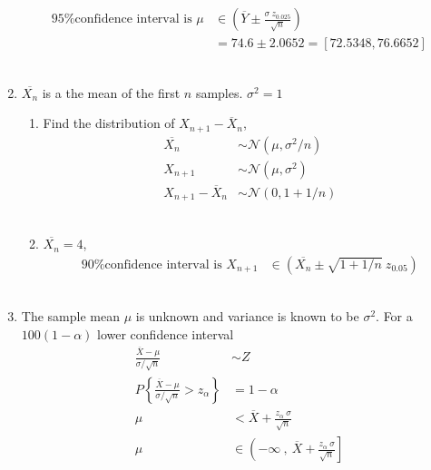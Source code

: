 \begin{enumerate}
	
		\begin{align}
			\text{95\% confidence interval is } \mu &\in \left(\overline{Y} \pm \frac{\sigma\ z_{0.025}}{\sqrt{n}}\right) \nonumber \\
			&= 74.6 \pm 2.0652 = [72.5348, 76.6652] 
		\end{align}\\
	
	
	\item $ \overline{X_n} $ is a the mean of the first $ n $ samples. $ \sigma^2 = 1 $ \\
	
		\begin{enumerate}
			\item Find the distribution of $ X_{n+1} - \overline{X}_n $, \\
			\begin{align}
				\overline{X_n} &\sim \mathcal{N}(\mu, \sigma^2/n) \nonumber \\
				X_{n+1} &\sim \mathcal{N}(\mu, \sigma^2) \nonumber \\
				X_{n+1} - \overline{X}_n &\sim \mathcal{N}(0,1 + 1/n)
			\end{align} \\
			
			\item $ \overline{X_n} = 4 $, \\
			\begin{align}
				\text{90\% confidence interval is } X_{n+1} &\in \left(\overline{X_n} \pm \sqrt{1 + 1/n}\ z_{0.05}\right)
			\end{align} \\
			
		\end{enumerate}
	
	
	\item The sample mean $ \mu $ is unknown and variance is known to be $ \sigma^2 $. For a $ 100(1-\alpha) $ lower confidence interval \\
	
	
		\begin{align}
			\frac{\overline{X} - \mu}{\sigma / \sqrt{n}} &\sim Z \nonumber \\
			P \left\{\frac{\overline{X} - \mu}{\sigma / \sqrt{n}} > z_\alpha\right\} &= 1 - \alpha\\
			\mu &< \overline{X} + \frac{z_\alpha\ \sigma}{\sqrt{n}} \nonumber \\
			\mu &\in \left(-\infty\ ,\ \overline{X} + \frac{z_\alpha\ \sigma}{\sqrt{n}}\right]
		\end{align}\\
	

\end{enumerate}
